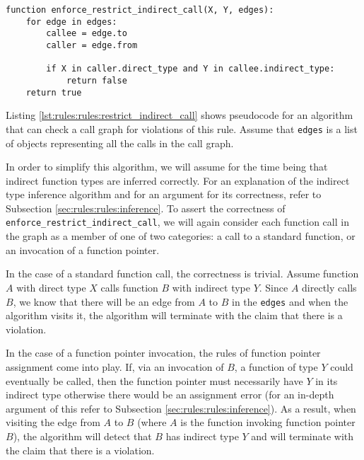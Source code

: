 \noindent \begin{minipage}[t]{\linewidth}
\begin{lstlisting}[caption={Pseudocode for an algorithm that can check a $restrict\_indirect\_call$ constraint.  This algorithm returns \lstinline{true} if the call graph respects the constraint and \lstinline{false} if the call graph violates it.},label={lst:rules:rules:restrict_indirect_call}]
function enforce_restrict_indirect_call(X, Y, edges):
    for edge in edges:
        callee = edge.to
        caller = edge.from

        if X in caller.direct_type and Y in callee.indirect_type:
            return false
    return true
\end{lstlisting}
\end{minipage}

Listing \ref{lst:rules:rules:restrict_indirect_call} shows pseudocode for an algorithm that can check a call graph for violations of this rule.  Assume that \lstinline{edges} is a list of objects representing all the calls in the call graph.  

In order to simplify this algorithm, we will assume for the time being that indirect function types are inferred correctly.  For an explanation of the indirect type inference algorithm and for an argument for its correctness, refer to Subsection \ref{sec:rules:rules:inference}.  To assert the correctness of \lstinline{enforce_restrict_indirect_call}, we will again consider each function call in the graph as a member of one of two categories: a call to a standard function, or an invocation of a function pointer.

In the case of a standard function call, the correctness is trivial.  Assume function $A$ with direct type $X$ calls function $B$ with indirect type $Y$.  Since $A$ directly calls $B$, we know that there will be an edge from $A$ to $B$ in the \lstinline{edges} and when the algorithm visits it, the algorithm will terminate with the claim that there is a violation.

In the case of a function pointer invocation, the rules of function pointer assignment come into play.  If, via an invocation of $B$, a function of type $Y$ could eventually be called, then the function pointer must necessarily have $Y$ in its indirect type otherwise there would be an assignment error (for an in-depth argument of this refer to Subsection \ref{sec:rules:rules:inference}).  As a result, when visiting the edge from $A$ to $B$ (where $A$ is the function invoking function pointer $B$), the algorithm will detect that $B$ has indirect type $Y$ and will terminate with the claim that there is a violation.  

